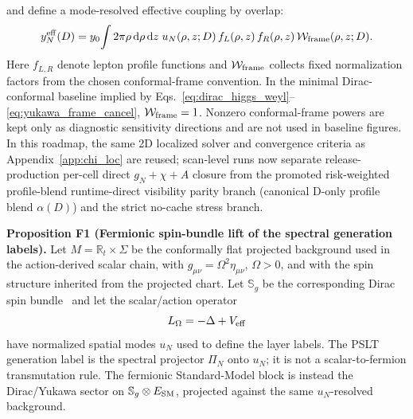 \documentclass[aps,prd,onecolumn,notitlepage,nofootinbib,superscriptaddress,11pt,floatfix]{revtex4-2}
\newcommand{\dd}{\mathrm{d}}
\begin{document}
and define a mode-resolved effective coupling by overlap:
\begin{equation}
y_N^{\rm eff}(D)=y_0\!\int 2\pi\rho\,\dd\rho\,\dd z\;
u_N(\rho,z;D)\,f_L(\rho,z)\,f_R(\rho,z)\,\mathcal{W}_{\rm frame}(\rho,z;D).
\label{eq:yukawa_eff_roadmap}
\end{equation}
Here $f_{L,R}$ denote lepton profile functions and $\mathcal{W}_{\rm frame}$ collects fixed normalization factors from the chosen conformal-frame convention. In the minimal Dirac-conformal baseline implied by Eqs.~\eqref{eq:dirac_higgs_weyl}--\eqref{eq:yukawa_frame_cancel}, $\mathcal{W}_{\rm frame}=1$. Nonzero conformal-frame powers are kept only as diagnostic sensitivity directions and are not used in baseline figures. In this roadmap, the same 2D localized solver and convergence criteria as Appendix~\ref{app:chi_loc} are reused; scan-level runs now separate release-production per-cell direct $g_N+\chi+A$ closure from the promoted risk-weighted profile-blend runtime-direct visibility parity branch (canonical D-only profile blend $\alpha(D)$) and the strict no-cache stress branch.

\medskip\noindent\textbf{Proposition F1 (Fermionic spin-bundle lift of the spectral generation labels).}
\label{prop:fermionic_lift}
Let \(M=\mathbb R_t\times\Sigma\) be the conformally flat projected background used in the action-derived scalar chain, with \(g_{\mu\nu}=\Omega^2\eta_{\mu\nu}\), \(\Omega>0\), and with the spin structure inherited from the projected chart.  Let \(\mathbb S_g\) be the corresponding Dirac spin bundle~\cite{LawsonMichelsohn1989} and let the scalar/action operator
\[
L_\Omega=-\Delta+V_{\rm eff}
\]
have normalized spatial modes \(u_N\) used to define the layer labels.  The PSLT generation label is the spectral projector \(\Pi_N\) onto \(u_N\); it is not a scalar-to-fermion transmutation rule.  The fermionic Standard-Model block is instead the Dirac/Yukawa sector on \(\mathbb S_g\otimes E_{\rm SM}\), projected against the same \(u_N\)-resolved background.
\end{document}
